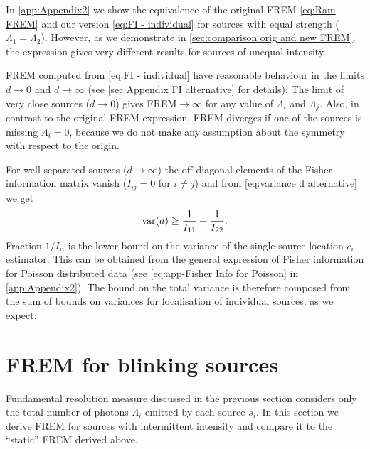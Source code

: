 In \autoref{app:Appendix2} we show the equivalence of the original FREM \autoref{eq:Ram FREM} and our version \autoref{eq:FI - individual} for sources with equal strength ($\Lambda_1=\Lambda_2$). However, as we demonstrate in \autoref{sec:comparison orig and new FREM}, the expression gives very different results for sources of unequal intensity. 

FREM computed from \autoref{eq:FI - individual} have reasonable behaviour in the limits $d\rightarrow0$ and $d\rightarrow\infty$ (see \autoref{sec:Appendix FI alternative} for details). The limit of very close sources ($d\rightarrow0$) gives FREM$\rightarrow\infty$ for any value of $\Lambda_i$ and $\Lambda_j$. Also, in contrast to the original FREM expression, FREM diverges if one of the sources is missing $\Lambda_i=0$, because we do not make any assumption about the symmetry with respect to the origin. 

For well separated sources ($d\rightarrow\infty$) the off-diagonal elements of the Fisher information matrix vanish ($I_{ij}=0$ for $i\neq j$) and from \autoref{eq:variance d alternative} we get
%
\begin{equation}
 	\mathrm{var}(d)\geq\frac{1}{I_{11}}+\frac{1}{I_{22}}.
\end{equation}
%
Fraction $1/I_{ii}$ is the lower bound on the variance of the single source location $c_i$ estimator. This can be obtained from the general expression of Fisher information for Poisson distributed data (see \autoref{eq:app-Fisher Info for Poisson} in \autoref{app:Appendix2}). The bound on the total variance is therefore composed from the sum of bounds on variances for localisation of individual sources, as we expect.



\section{FREM for blinking sources\label{sec:FREM for blinking}}

Fundamental resolution measure discussed in the previous section considers only the total number of photons $\Lambda_i$ emitted by each source $s_i$. In this section we derive FREM for sources with intermittent intensity and compare it to the ``static'' FREM derived above. 

